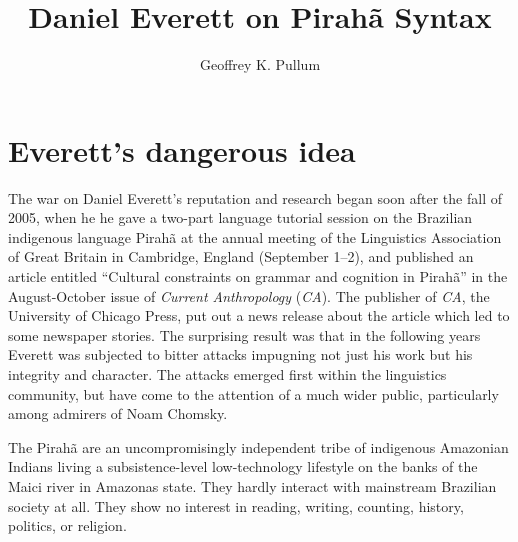 \documentclass[output=paper,colorlinks,citecolor=brown
]{langscibook}
\author{Geoffrey K. Pullum\orcid{0000-0002-7748-8847}\affiliation{University of Edinburgh}}
\title{Daniel Everett on Pirah\~a Syntax}
\begin{document}
\maketitle
\label{chap-3_pullum}



\section{Everett's dangerous idea}\label{intro}

The war on Daniel Everett's reputation and research began soon after
the fall of 2005, when he he gave a two-part language tutorial session
on the Brazilian indigenous language Pirah{\~a} at the annual meeting
of the Linguistics Association of Great Britain in Cambridge, England
(September 1--2), and published an article entitled ``Cultural constraints
on grammar and cognition in Pirah{\~a}'' in the August-October issue of
\textit{Current Anthropology} (\textit{CA}). The publisher of \textit{CA},
the University of Chicago Press, put out a news release about the article
which led to some newspaper stories. The surprising result was that in
the following years Everett was subjected to bitter attacks impugning
not just his work but his integrity and character. The attacks emerged
first within the linguistics community, but have come to the attention
of a much wider public, particularly among admirers of Noam Chomsky.

The Pirah{\~a} are an uncompromisingly independent tribe of indigenous
Amazonian Indians living a subsistence-level low-technology lifestyle
on the banks of the Maici river in Amazonas state. They hardly interact
with mainstream Brazilian society at all. They show no interest in
reading, writing, counting, history, politics, or religion.
\end{document}
